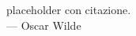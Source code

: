 

\cleardoublepage
{}
\thispagestyle{empty}

\vspace*{3cm}

\begin{center}
	placeholder con citazione. \\ \medskip
	--- Oscar Wilde
\end{center}

\medskip

